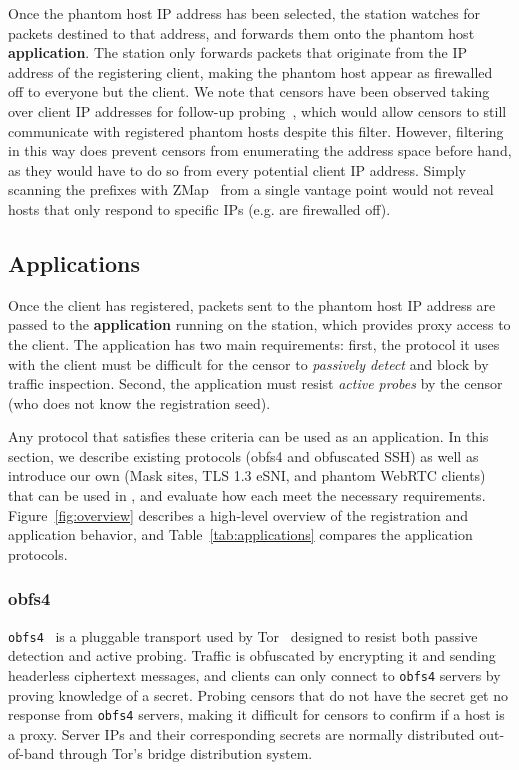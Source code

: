 \documentclass[sigconf,anonymous]{acmart}
\begin{document}
Once the phantom host IP address has been selected, the station watches for
packets destined to that address, and forwards them onto the phantom host
\textbf{application}. The station only forwards packets that originate from the
IP address of the registering client, making the phantom host appear as
firewalled off to everyone but the client.
We note that censors have been observed taking over client IP
addresses for follow-up probing~\cite{ensafi-tor}, which would allow censors to
still communicate with registered phantom hosts despite this filter.
However, filtering in this way does prevent censors from enumerating the
address space before hand, as they would have to do so from every potential
client IP address. Simply scanning the prefixes with ZMap~\cite{zmap13} from a
single vantage point would not reveal hosts that only respond to specific IPs
(e.g. are firewalled off).


\subsection{Applications}


Once the client has registered, packets sent to the phantom host IP address are
passed to the \textbf{application} running on the station, which provides
proxy access to the client. The application has
two main requirements: first, the protocol it uses with the client 
must be difficult for the censor to \emph{passively detect} and block by traffic
inspection. Second, the application must resist \emph{active probes} by the censor (who
does not know the registration seed).

Any protocol that satisfies these criteria can be used as an application. In
this section, we describe existing protocols (obfs4 and obfuscated SSH) as well
as introduce our own (Mask sites, TLS 1.3 eSNI, and phantom WebRTC clients) that
can be used in \scheme, and evaluate how each meet the necessary requirements.
Figure~\ref{fig:overview} describes a high-level overview of the \scheme
registration and application behavior, and Table~\ref{tab:applications} compares the
application protocols.

\FigOverview


\subsubsection{obfs4}

\texttt{obfs4}~\cite{obfs4} is a pluggable transport used by
Tor~\cite{tor} designed to resist both passive detection and active probing.
Traffic is obfuscated by encrypting it and sending headerless ciphertext
messages, and clients can only connect to \texttt{obfs4}
servers by proving knowledge of a secret. Probing censors that do not have the
secret get no response from \texttt{obfs4} servers, making it difficult for
censors to confirm if a host is a proxy. Server IPs and their corresponding secrets
are normally distributed out-of-band through Tor's bridge distribution system.
\end{document}
